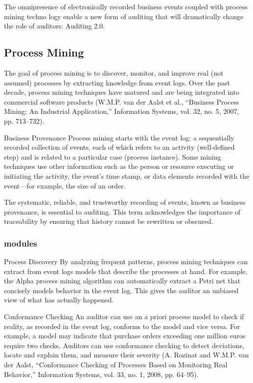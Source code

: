 The omnipresence of electronically recorded business events coupled with process mining techno logy enable a new form of auditing that will dramatically change the role of auditors: Auditing 2.0.

\subsection{Process Mining}

The goal of process mining is to discover, monitor, and improve real (not assumed) processes by extracting knowledge from event logs. Over the past decade, process mining techniques have matured and are being integrated into commercial software products (W.M.P. van der Aalst et al., “Business Process Mining: An Industrial Application,” Information Systems, vol. 32, no. 5, 2007, pp. 713–732).

Business Provenance
Process mining starts with the event log: a sequentially recorded collection of events, each of which refers to an activity (well-defined step) and is related to a particular case (process instance). Some mining techniques use other information such as the person or resource executing or initiating the activity, the event's time stamp, or data elements recorded with the event—for example, the size of an order.

The systematic, reliable, and trustworthy recording of events, known as business provenance, is essential to auditing. This term acknowledges the importance of traceability by ensuring that history cannot be rewritten or obscured.

\subsubsection{modules}

Process Discovery \citep{5427384}
By analyzing frequent patterns, process mining techniques can extract from event logs models that describe the processes at hand. For example, the Alpha process mining algorithm can automatically extract a Petri net that concisely models behavior in the event log. This gives the auditor an unbiased view of what has actually happened.

Conformance Checking
An auditor can use an a priori process model to check if reality, as recorded in the event log, conforms to the model and vice versa. For example, a model may indicate that purchase orders exceeding one million euros require two checks. Auditors can use conformance checking to detect deviations, locate and explain them, and measure their severity (A. Rozinat and W.M.P. van der Aalst, “Conformance Checking of Processes Based on Monitoring Real Behavior,” Information Systems, vol. 33, no. 1, 2008, pp. 64–95).


